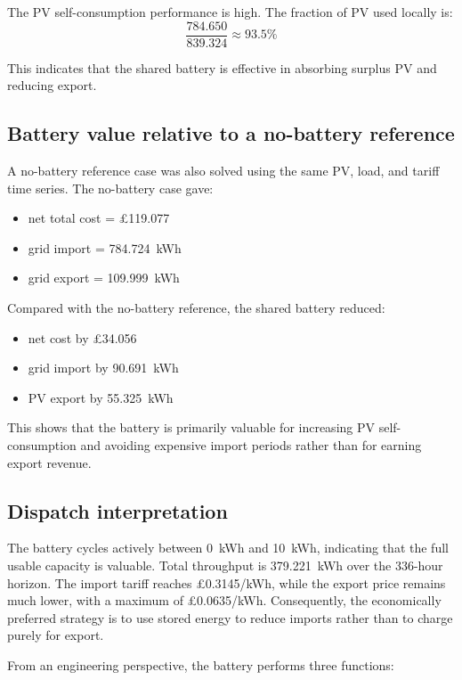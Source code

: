\documentclass[12pt,a4paper]{article}
\begin{document}
The PV self-consumption performance is high. The fraction of PV used locally is:
\[
\frac{784.650}{839.324} \approx 93.5\%
\]

This indicates that the shared battery is effective in absorbing surplus PV and reducing export.

\subsection{Battery value relative to a no-battery reference}

A no-battery reference case was also solved using the same PV, load, and tariff time series. The no-battery case gave:

\begin{itemize}
    \item net total cost = \pounds 119.077
    \item grid import = \SI{784.724}{kWh}
    \item grid export = \SI{109.999}{kWh}
\end{itemize}

Compared with the no-battery reference, the shared battery reduced:

\begin{itemize}
    \item net cost by \pounds 34.056
    \item grid import by \SI{90.691}{kWh}
    \item PV export by \SI{55.325}{kWh}
\end{itemize}

This shows that the battery is primarily valuable for increasing PV self-consumption and avoiding expensive import periods rather than for earning export revenue.

\subsection{Dispatch interpretation}

The battery cycles actively between \SI{0}{kWh} and \SI{10}{kWh}, indicating that the full usable capacity is valuable. Total throughput is \SI{379.221}{kWh} over the 336-hour horizon. The import tariff reaches \pounds 0.3145/kWh, while the export price remains much lower, with a maximum of \pounds 0.0635/kWh. Consequently, the economically preferred strategy is to use stored energy to reduce imports rather than to charge purely for export.

From an engineering perspective, the battery performs three functions:
\end{document}
